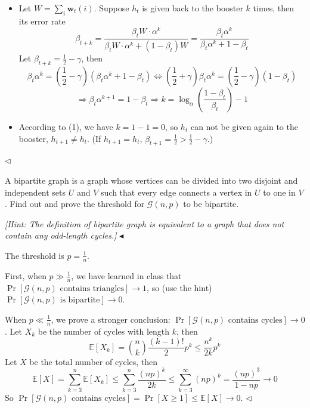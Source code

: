 \documentclass[11pt]{article}
\newenvironment{problem}[2][Problem]{\begin{trivlist}
\item[\hskip \labelsep {\bfseries #1}\hskip \labelsep {\bfseries #2.}]}{\hfill$\blacktriangleleft$\end{trivlist}}
\newenvironment{answer}[1][Answer]{\begin{trivlist}
\item[\hskip \labelsep {\bfseries #1.}\hskip \labelsep]}{\hfill$\lhd$\end{trivlist}}
\newcommand\E{\mathbb{E}}
\begin{document}
\begin{answer}
    \begin{itemize}
        \item[(1)] Let $W = \sum_i \bm w_t(i)$. Suppose $h_t$ is given back to the booster $k$ times, then its error rate
        \[\beta_{t+k} = \frac{\beta_t W \cdot \alpha^k}{\beta_t W \cdot \alpha^k + (1 - \beta_t)W} = \frac{\beta_t \alpha^k}{\beta_t \alpha^k + 1 - \beta_t}\]
        Let $\beta_{t+k} = \frac{1}{2} - \gamma$, then
        \[\beta_t \alpha^k = (\frac{1}{2} - \gamma)(\beta_t \alpha^k + 1 - \beta_t) \Longleftrightarrow \left(\frac{1}{2} + \gamma\right)\beta_t\alpha^k = \left(\frac{1}{2} - \gamma\right)(1 - \beta_t)\]
        \[\Longrightarrow \beta_t \alpha^{k+1} = 1 - \beta_t \Longrightarrow k = \log_\alpha \left(\frac{1 - \beta_t}{\beta_t}\right) - 1\]
        \item[(2)] According to (1), we have $k = 1 - 1 = 0$, so $h_t$ can not be given again to the booster, $h_{t+1} \neq h_t$. (If $h_{t+1} = h_t$, $\beta_{t+1} = \frac{1}{2} > \frac{1}{2} - \gamma$.)
    \end{itemize}
\end{answer}

\begin{problem}{5 (20')}
A bipartite graph is a graph whose vertices can be divided into two disjoint and independent sets $U$ and $V$ such that every edge connects a vertex in $U$ to one in $V$. Find out and prove the threshold for $\mathcal{G}(n,p)$ to be bipartite.

\textit{[Hint: The definition of bipartite graph is equivalent to a graph that does not contain any odd-length cycles.]}
\end{problem}

\begin{answer}
    The threshold is $p = \frac{1}{n}$.

    First, when $p \gg \frac{1}{n}$, we have learned in class that $\Pr[\mathcal{G}(n, p)\text{ contains triangles}] \to 1$, so (use the hint) $\Pr[\mathcal{G}(n,p)\text{ is bipartite}] \to 0$.

    When $p \ll \frac{1}{n}$, we prove a stronger conclusion: $\Pr[\mathcal{G}(n,p)\text{ contains cycles}] \to 0$. Let $X_k$ be the number of cycles with length $k$, then
    \[\E[X_k] = \binom{n}{k} \frac{(k-1)!}{2} p^k \le \frac{n^k}{2k} p^k\]
    Let $X$ be the total number of cycles, then
    \[\E[X] = \sum_{k=3}^n \E[X_k] \le \sum_{k=3}^n \frac{(np)^k}{2k} \le \sum_{k=3}^\infty (np)^k = \frac{(np)^3}{1 - np} \to 0\]
    So $\Pr[\mathcal{G}(n,p)\text{ contains cycles}] = \Pr[X \ge 1] \le \E[X] \to 0$.
\end{answer}
\end{document}
